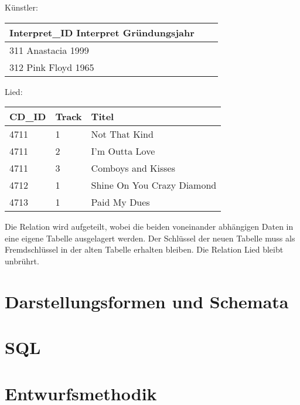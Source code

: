 \documentclass{scrbook}
\begin{document}
Künstler:\\
\begin{tabular}{| l | l | l |}
\hline
Interpret\_ID	Interpret		Gründungsjahr \\
\hline
311				Anastacia		1999 \\
312				Pink Floyd		1965 \\
\hline
\end{tabular}

Lied:\\
\begin{tabular}{| l | l | l |}
\hline
CD\_ID	& Track		& Titel \\
\hline
4711	& 1			& Not That Kind \\
4711	& 2			& I'm Outta Love \\
4711	& 3			& Comboys and Kisses \\
4712	& 1			& Shine On You Crazy Diamond \\
4713	& 1			& Paid My Dues \\
\hline
\end{tabular}


Die Relation wird aufgeteilt, wobei die beiden voneinander abhängigen Daten in eine eigene
Tabelle ausgelagert werden. Der Schlüssel der neuen Tabelle muss als Fremdschlüssel
in der alten Tabelle erhalten bleiben.
Die Relation Lied bleibt unbrührt.












\chapter{Darstellungsformen und Schemata}


\chapter{SQL}


\chapter{Entwurfsmethodik}
\end{document}
